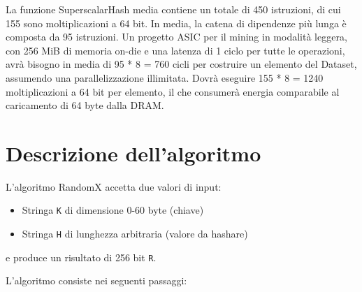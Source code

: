 La funzione SuperscalarHash media contiene un totale di 450 istruzioni, di cui 155 sono moltiplicazioni a 64 bit. In media, la catena di dipendenze più lunga è composta da 95 istruzioni. Un progetto ASIC per il mining in modalità leggera, con 256 MiB di memoria on-die e una latenza di 1 ciclo per tutte le operazioni, avrà bisogno in media di 95 * 8 = 760 cicli per costruire un elemento del Dataset, assumendo una parallelizzazione illimitata. Dovrà eseguire 155 * 8 = 1240 moltiplicazioni a 64 bit per elemento, il che consumerà energia comparabile al caricamento di 64 byte dalla DRAM.



\section{Descrizione dell'algoritmo}

L'algoritmo RandomX accetta due valori di input:

\begin{itemize}
    \item Stringa \texttt{K} di dimensione 0-60 byte (chiave)
    \item Stringa \texttt{H} di lunghezza arbitraria (valore da hashare)
\end{itemize}

e produce un risultato di 256 bit \texttt{R}.

L'algoritmo consiste nei seguenti passaggi:

